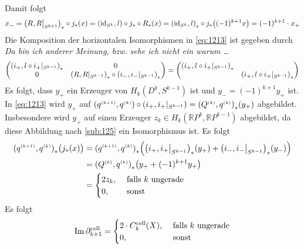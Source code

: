 Damit folgt
\begin{align*}
	 x_- = \enbrace*{R,R\big|_{S^{k+1}}}_* \circ j_* (x) = \enbrace*{\id_{S^k},l} \circ j_* \circ R_*(x) = \enbrace*{\id_{S^k},l}_* \circ j_* \enbrace*{(-1)^{k+1}x} = 
	 (-1)^{k+1}\cdot x_+    
\end{align*}
Die Komposition der horizontalen Isomorphismen in \eqref{eq:1213} ist gegeben durch \\
\emph{Da bin ich anderer Meinung, bzw. sehe ich nicht ein warum \ldots}
\[
	\begin{pmatrix}
		\enbrace*{i_+,l \circ i_+|_{S^{k-1}}}_* & 0 \\
		0 & \enbrace*{R,R|_{S^{k-1}}}_*  \circ \enbrace*{i_-, i_-|_{S^{k-1}}}_*
	\end{pmatrix}=
	\begin{pmatrix}
		\enbrace*{i_+, l \circ i_+|_{S^{k-1}}}_* & \\
		& \enbrace*{i_+,l \circ i_+|_{S^{k-1}}}_*
	\end{pmatrix}
\]
Es folgt, dass $y_+$ ein Erzeuger von $H_k(D^k,S^{k-1})$ ist und $y_- = (-1)^{k+1} y_+$ ist. In \eqref{eq:1213} wird $y_+$ auf 
$(q^\ssbrace{k+1},q^\ssbrace{k}) \circ (i_+,i_+|_{S^{k-1}}) = \enbrace*{Q^\ssbrace{k},q^\ssbrace{k}}_*(y_+)$
abgebildet. Insbesondere wird $y_+$ auf einen Erzeuger $z_k \in H_k(\mathds{R}P^k,\mathds{R}P^{k-1})$ abgebildet, da diese Abbildung nach \ref{sub:125} ein Isomorphismus 
ist. Es folgt 
\begin{align*}
	\enbrace*{q^\ssbrace{k+1},q^\ssbrace{k}}_* \enbrace[\big]{j_*(x)} &= \enbrace*{q^\ssbrace{k+1},q^\ssbrace{k}}_* \enbrace*{\enbrace*{i_+,i_+\big|_{S^{k-1}}}_*(y_+) +
	\enbrace*{i_-,i_-\big|_{S^{k-1}}}_*(y_-) } \\
	&= \enbrace*{Q^\ssbrace{k},q^\ssbrace{k}}_* \enbrace*{y_+ + (-1)^{k+1} y_+} \\
	& = \begin{cases}
		2 z_k, &\text{ falls }k \text{ ungerade}\\
		0 , &\text{ sonst}
	\end{cases}  
\end{align*}
Es folgt 
\[
	\im  \partial_{k+1}^{\cell} = \begin{cases}
	2 \cdot C^{\cell}_k(X), &\text{ falls } k \text{ ungerade}\\
	0 , &\text{ sonst}
\end{cases}
\]
